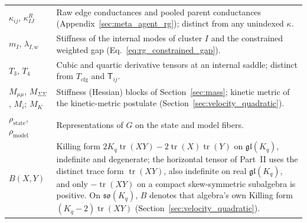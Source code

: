 {\begin{longtable}{@{}p{}p{}@{}}
$\kappa_{ij}$, $\kappa^R_{IJ}$ & Raw edge conductances and pooled parent conductances (Appendix~\ref{sec:meta_agent_rg}); distinct from any unindexed $\kappa$. \\
$m_I$, $\lambda_{I,w}$ & Stiffness of the internal modes of cluster $I$ and the constrained weighted gap (Eq.~\eqref{eq:rg_constrained_gap}). \\
$T_3$, $T_4$ & Cubic and quartic derivative tensors at an internal saddle; distinct from $T_{\mathrm{cfg}}$ and $\mathsf{T}_{ij}$. \\
$M_{\mu\mu}$, $M_{\Sigma\Sigma}$, $M_i$; $M_K$ & Stiffness (Hessian) blocks of Section~\ref{sec:mass}; kinetic metric of the kinetic-metric postulate (Section~\ref{sec:velocity_quadratic}). \\
$\rho_{\mathrm{state}}$, $\rho_{\mathrm{model}}$ & Representations of $G$ on the state and model fibers. \\
$B(X,Y)$ & Killing form $2K_q\operatorname{tr}(XY)-2\operatorname{tr}(X)\operatorname{tr}(Y)$ on $\mathfrak{gl}(K_q)$, indefinite and degenerate; the horizontal tensor of Part~II uses the distinct trace form $\operatorname{tr}(XY)$, also indefinite on real $\mathfrak{gl}(K_q)$, and only $-\operatorname{tr}(XY)$ on a compact skew-symmetric subalgebra is positive. On $\mathfrak{so}(K_q)$, $B$ denotes that algebra's own Killing form $(K_q-2)\operatorname{tr}(XY)$ (Section~\ref{sec:velocity_quadratic}). \\
\end{longtable}}




